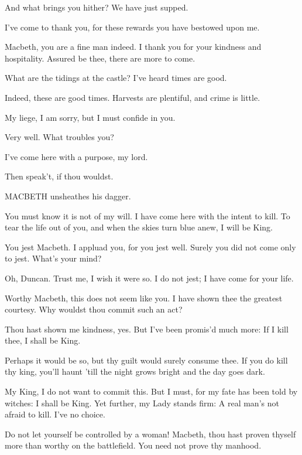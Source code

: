 \documentclass{article}
\begin{document}
\duncan And what brings you hither? We have just supped.

\macbeth I've come to thank you, for these rewards you have bestowed upon me.

\duncan Macbeth, you are a fine man indeed. I thank you for your kindness and hospitality. Assured be thee, there are more to come.

\macbeth What are the tidings at the castle? I've heard times are good.

\duncan Indeed, these are good times. Harvests are plentiful, and crime is little.


\macbeth My liege, I am sorry, but I must confide in you.

\duncan Very well. What troubles you?

\macbeth I've come here with a purpose, my lord.

\duncan Then speak't, if thou wouldst.

\begin{dida}
MACBETH unsheathes his dagger.
\end{dida}

\macbeth You must know it is not of my will. I have come here with the intent to kill. To tear the life out of you, and when the skies turn blue anew, I will be King.

\duncan {} You jest Macbeth. I appluad you, for you jest well. Surely you did not come only to jest. What's your mind?

\macbeth Oh, Duncan. Trust me, I wish it were so. I do not jest; I have come for your life.

\duncan Worthy Macbeth, this does not seem like you. I have shown thee the greatest courtesy. Why wouldst thou commit such an act?

\macbeth Thou hast shown me kindness, yes. But I've been promis'd much more: If I kill thee, I shall be King.


\duncan Perhaps it would be so, but thy guilt would surely consume thee. If you do kill thy king, you'll haunt 'till the night grows bright and the day goes dark.

\macbeth My King, I do not want to commit this. But I must, for my fate has been told by witches: I shall be King. Yet further, my Lady stands firm: A real man's not afraid to kill. I've no choice.

\duncan Do not let yourself be controlled by a woman! Macbeth, thou hast proven thyself more than worthy on the battlefield. You need not prove thy manhood.
\end{document}
